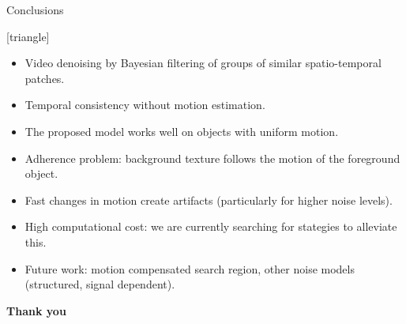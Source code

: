 \documentclass[mathserif, 8pt]{beamer}
\begin{document}
\begin{frame}{Conclusions}

	[triangle]

	\begin{itemize}\itemsep=.5cm
		\item Video denoising by Bayesian filtering of groups of similar spatio-temporal patches.
		\item Temporal consistency without motion estimation.
		\item The proposed model works well on objects with uniform motion.
				\item Adherence problem: background texture follows the motion of the foreground object.
				\item Fast changes in motion create artifacts (particularly for
					higher noise levels). 
				\item High computational cost: we are currently searching for stategies to alleviate this.
		\item Future work: motion compensated search region, other noise models (structured, signal dependent).
	\end{itemize}


\end{frame}

\begin{frame}

	\centerline{\Huge{\textbf{Thank you}}}

\end{frame}
\end{document}
